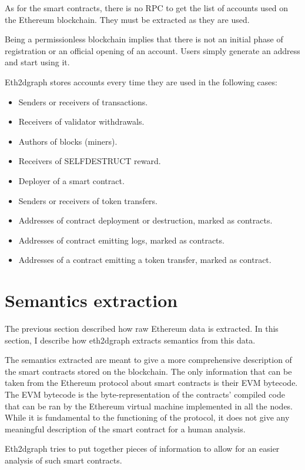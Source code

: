 As for the smart contracts, there is no RPC to get the list of accounts used on the Ethereum blockchain. They must be extracted as they are used.

Being a permissionless blockchain implies that there is not an initial phase of registration or an official opening of an account. Users simply generate an address and start using it. 

Eth2dgraph stores accounts every time they are used in the following cases:

\begin{itemize}
    \item Senders or receivers of transactions.
    \item Receivers of validator withdrawals.
    \item Authors of blocks (miners).
    \item Receivers of SELFDESTRUCT reward.
    \item Deployer of a smart contract.
    \item Senders or receivers of token transfers.
    \item Addresses of contract deployment or destruction, marked as contracts.
    \item Addresses of contract emitting logs, marked as contracts.
    \item Addresses of a contract emitting a token transfer, marked as contract.
\end{itemize}

\section{Semantics extraction}

The previous section described how raw Ethereum data is extracted. In this section, I describe how eth2dgraph extracts semantics from this data.

The semantics extracted are meant to give a more comprehensive description of the smart contracts stored on the blockchain. The only information that can be taken from the Ethereum protocol about smart contracts is their EVM bytecode. The EVM bytecode is the byte-representation of the contracts' compiled code that can be ran by the Ethereum virtual machine implemented in all the nodes. While it is fundamental to the functioning of the protocol, it does not give any meaningful description of the smart contract for a human analysis. 

Eth2dgraph tries to put together pieces of information to allow for an easier analysis of such smart contracts.


